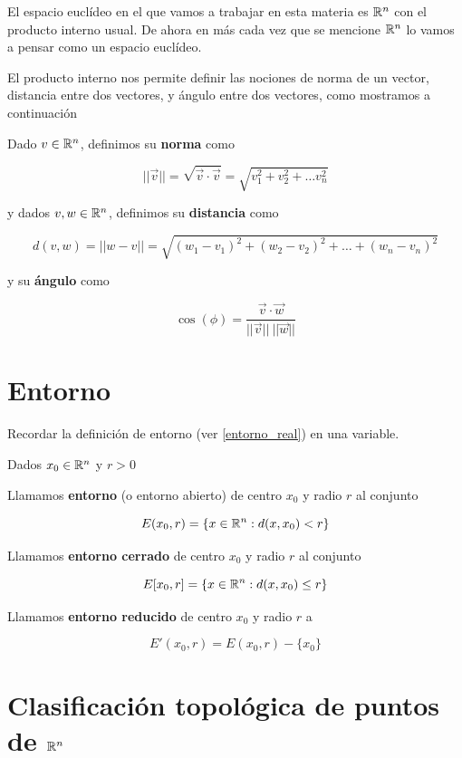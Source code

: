 El espacio euclídeo en el que vamos a trabajar en esta materia es $ \mathbb{R}^n$ con el producto interno usual.  De ahora en más cada vez que se mencione $\mathbb{R}^n$ lo vamos a pensar como un espacio euclídeo.

El producto interno nos permite definir las nociones de norma de un vector, distancia entre dos vectores, y ángulo entre dos vectores, como mostramos a continuación

\begin{definition}[Norma]
Dado $v \in \mathbb{R}^n$, definimos su \textbf{norma} como

$$ ||\vec{v}|| = \sqrt{\vec{v} \cdot \vec{v}} = \sqrt{v_1^2 + v_2^2 + \ldots v_n^2} $$

y dados $v,w \in \mathbb{R}^n$, definimos su \textbf{distancia} como

$$ d(v, w) = ||w-v|| = \sqrt{ (w_1 - v_1)^2 + (w_2 - v_2)^2 + \ldots + (w_n - v_n)^2 } $$

y su \textbf{ángulo} como

$$ \cos(\phi) = \frac{\vec{v} \cdot \vec{w}}{||\vec{v}|| \ || \vec{w}||} $$
\end{definition}


\section{Entorno}

Recordar la definición de entorno (ver \ref{entorno_real}) en una variable.

\begin{definition}[Entorno]
Dados $x_0 \in \mathbb{R}^n$ y $r > 0$ 

Llamamos \textbf{entorno}  (o entorno abierto) de centro $x_0$ y radio $r$ al conjunto

$$ E(x_0,r) = \{ x \in \mathbb{R}^n : d(x,x_0) < r\} $$

Llamamos \textbf{entorno cerrado} de centro $x_0$ y radio $r$ al conjunto

$$ E[x_0,r] = \{ x \in \mathbb{R}^n : d(x,x_0) \leq r\} $$

Llamamos \textbf{entorno reducido} de centro $x_0$ y radio $r$ a 

$$ E'(x_0,r) = E(x_0,r) - \{x_0\}$$
\end{definition}

\section{Clasificación topológica de puntos de $\mathbb{R}^n$}

